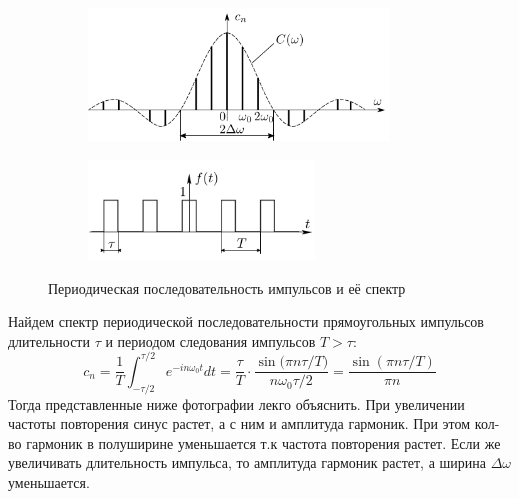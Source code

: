 \begin{figure}[h!]
    \centering
    \begin{subfigure}{.6\linewidth}
        \centering
        \includegraphics[width=8cm]{images/spectr.png}
    \end{subfigure}
    \hfill
    \begin{subfigure}{.39\linewidth}
        \centering
        \includegraphics[width=6cm]{images/periodic_signals.png}
    \end{subfigure}
    \caption{Периодическая последовательность импульсов и её спектр}
\end{figure}
Найдем спектр периодической последовательности прямоугольных импульсов длительности $\tau$ и периодом следования импульсов $T > \tau$:
\begin{equation}
    c_n = \frac{1}{T}\int_{-\tau / 2}^{\tau / 2} e^{-in\omega_0t}dt = \frac{\tau}{T}\cdot\frac{\sin({\pi n \tau / T)}}{n\omega_0 \tau / 2} = \frac{\sin(\pi n\tau /T) }{\pi n}
\end{equation}
\indent Тогда представленные ниже фотографии лекго объяснить. При увеличении частоты повторения синус растет, а с ним и амплитуда гармоник. При этом кол-во гармоник в полуширине уменьшается т.к частота повторения растет. Если же увеличивать длительность импульса, то амплитуда гармоник растет, а ширина $\Delta \omega$ уменьшается.
\newpage
